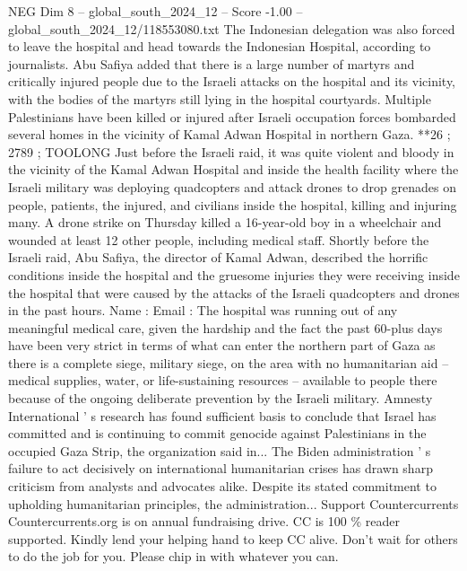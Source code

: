 \begin{textsample}{NEG Dim 8 – global\_south\_2024\_12 – Score -1.00 – global\_south\_2024\_12/118553080.txt}
The Indonesian delegation was also forced to leave the hospital and head towards the Indonesian Hospital, according to journalists.
Abu Safiya added that there is a large number of martyrs and critically injured people due to the Israeli attacks on the hospital and its vicinity, with the bodies of the martyrs still lying in the hospital courtyards.
Multiple Palestinians have been killed or injured after Israeli occupation forces bombarded several homes in the vicinity of Kamal Adwan Hospital in northern Gaza. **26 ; 2789 ; TOOLONG Just before the Israeli raid, it was quite violent and bloody in the vicinity of the Kamal Adwan Hospital and inside the health facility where the Israeli military was deploying quadcopters and attack drones to drop grenades on people, patients, the injured, and civilians inside the hospital, killing and injuring many.
A drone strike on Thursday killed a 16-year-old boy in a wheelchair and wounded at least 12 other people, including medical staff.
Shortly before the Israeli raid, Abu Safiya, the director of Kamal Adwan, described the horrific conditions inside the hospital and the gruesome injuries they were receiving inside the hospital that were caused by the attacks of the Israeli quadcopters and drones in the past hours.
Name : Email : The hospital was running out of any meaningful medical care, given the hardship and the fact the past 60-plus days have been very strict in terms of what can enter the northern part of Gaza as there is a complete siege, military siege, on the area with no humanitarian aid -- medical supplies, water, or life-sustaining resources -- available to people there because of the ongoing deliberate prevention by the Israeli military.
Amnesty International ' s research has found sufficient basis to conclude that Israel has committed and is continuing to commit genocide against Palestinians in the occupied Gaza Strip, the organization said in...
The Biden administration ' s failure to act decisively on international humanitarian crises has drawn sharp criticism from analysts and advocates alike.
Despite its stated commitment to upholding humanitarian principles, the administration...
Support Countercurrents Countercurrents.org is on annual fundraising drive.
CC is 100 \% reader supported.
Kindly lend your helping hand to keep CC alive.
Don't wait for others to do the job for you.
Please chip in with whatever you can.

\end{textsample}
